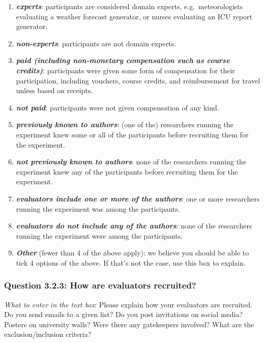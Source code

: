 \documentclass[11pt,a4paper]{article}
\newcommand{\egcvalue}[1]{\textbf{\textit{#1}}}
\begin{document}
\begin{enumerate}[itemsep=0cm,leftmargin=0.5cm,label={\small $\square$}]
    \item \egcvalue{experts}: participants are considered domain experts, e.g.\ meteorologists evaluating a weather forecast generator, or nurses evaluating an ICU report generator.
    \item \egcvalue{non-experts}: participants are not domain experts.
    \item \egcvalue{paid (including non-monetary compensation such as course credits)}: participants were given some form of compensation for their participation, including vouchers, course credits, and reimbursement for travel unless based on receipts.
    \item \egcvalue{not paid}: participants were not given compensation of any kind.
    \item \egcvalue{previously known to authors}: (one of the) researchers running the experiment knew some or all of the participants before recruiting them for the experiment.
    \item \egcvalue{not previously known to authors}: none of the researchers running the experiment knew any of the participants before recruiting them for the experiment.
    \item \egcvalue{evaluators include one or more of the authors}: one or more researchers running the experiment was among the participants.
    \item \egcvalue{evaluators do not include any of the authors}: none of the researchers running the experiment were among the participants.
    \item \egcvalue{Other} (fewer than 4 of the above apply): we believe you should be able to tick 4 options of the above. If that's not the case, use this box to explain.
\end{enumerate}

\vspace{-.3cm}
\subsubsection*{Question 3.2.3:  How are evaluators recruited?}

\noindent\textit{What to enter in the text box}: Please explain how your evaluators are recruited. Do you send emails to a given list? Do you post invitations on social media? Posters on university walls? Were there any gatekeepers involved? What are the exclusion/inclusion criteria? 
\end{document}
